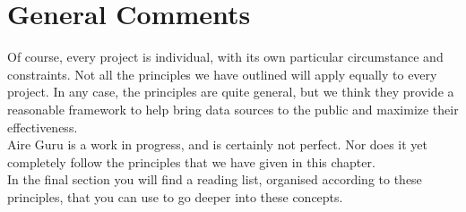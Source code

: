 \section{General Comments}

Of course, every project is individual, with its own particular circumstance and constraints. Not all
the principles we have outlined will apply equally to every project. In any case, the principles are
quite general, but we think they provide a reasonable framework to help bring data sources to the public
and maximize their effectiveness.\\

Aire Guru is a work in progress, and is certainly not perfect. Nor does it yet completely follow the principles
that we have given in this chapter.\\

In the final section you will find a reading list, organised according to these principles, that you
can use to go deeper into these concepts.\\